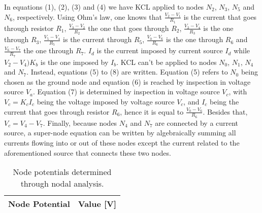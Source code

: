 \par
 In equations (1), (2), (3) and (4) we have KCL applied to nodes $N_2$, $N_3$, $N_5$ and $N_6$, respectively.  Using Ohm's law, one knows that $\frac{V_2 - V_1}{R_1}$ is the current that goes through resistor $R_1$, $\frac{V_3-V_2}{R_2}$ the one that goes through $R_2$, $\frac{V_2-V_4}{R_3}$ is the one through $R_3$, $\frac{V_5-V_4}{R_5}$ is the current through $R_5$, $\frac{V_0-V_6}{R_6}$ is the one through $R_6$ and $\frac{V_6-V_7}{R_7}$ the one through $R_7$. $I_d$ is the current imposed by current source $I_d$ while $V_2-V_4)K_b$ is the one imposed by $I_b$. KCL can't be applied to nodes $N_0$, $N_1$, $N_4$ and $N_7$. Instead, equations (5) to (8) are written. Equation (5) refers to $N_0$ being chosen as the ground node and equation (6) is reached by inspection in voltage source $V_a$. Equation (7) is determined by inspection in voltage source $V_c$, with $V_c = K_c I_c$ being the voltage imposed by voltage source $V_c$, and $I_c$ being the current that goes through resistor $R_6$, hence it is equal to $\frac{V_0 - V_6}{R_6}$. Besides that, $V_c = V_4-V_7$. Finally, because nodes $N_4$ and $N_7$ are connected by a current source, a super-node equation can be written by algebraically summing all currents flowing into or out of these nodes except the current related to the aforementioned source that connects these two nodes.



\begin{table}[hbt!]
  \centering
  \begin{tabular}{|c|c|}
    \hline    
    {\bf Node Potential} & {\bf Value [V]} \\ \hline
    
  \end{tabular}
  \caption{Node potentials determined through nodal analysis.}
  \label{tab:node}
\end{table}




